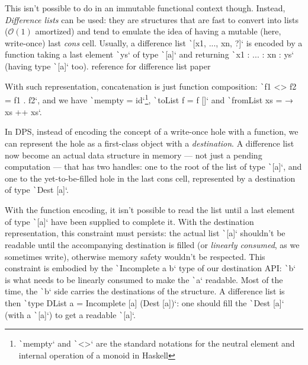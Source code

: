 \documentclass[english]{jflart}
\newcommand{\TODO}[1]{{\color{red}\large #1}}
\begin{document}
This isn't possible to do in an immutable functional context though. Instead, \emph{Difference lists} can be used: they are structures that are fast to convert into lists ($\mathcal{O}(1)$ amortized) and tend to emulate the idea of having a mutable (here, write-once) last \emph{cons} cell. Usually, a difference list \texttt`[x1, ..., xn, ?]` is encoded by a function taking a last element \texttt`ys` of type \texttt`[a]` and returning \texttt`x1 : ... : xn : ys` (having type \texttt`[a]` too). \TODO{reference for difference list paper}

With such representation, concatenation is just function composition: \texttt`f1 <> f2 = f1 . f2`, and we have \texttt`mempty = id`\footnote{\texttt`mempty` and \texttt`<>` are the standard notations for the neutral element and internal operation of a monoid in Haskell}, \texttt`toList f = f []` and \texttt`fromList xs = \ys → xs ++ xs`.

In DPS, instead of encoding the concept of a write-once hole with a function, we can represent the hole as a first-class object with a \emph{destination}. A difference list now become an actual data structure in memory --- not just a pending computation --- that has two handles: one to the root of the list of type \texttt`[a]`, and one to the yet-to-be-filled hole in the last cons cell, represented by a destination of type \texttt`Dest [a]`.

With the function encoding, it isn't possible to read the list until a last element of type \texttt`[a]` have been supplied to complete it. With the destination representation, this constraint must persists: the actual list \texttt`[a]` shouldn't be readable until the accompanying destination is filled (or \emph{linearly consumed}, as we sometimes write), otherwise memory safety wouldn't be respected. This constraint is embodied by the \texttt`Incomplete a b` type of our destination API: \texttt`b` is what needs to be linearly consumed to make the \texttt`a` readable. Most of the time, the \texttt`b` side carries the destinations of the structure. A difference list is then \texttt`type DList a = Incomplete [a] (Dest [a])`: one should fill the \texttt`Dest [a]` (with a \texttt`[a]`) to get a readable \texttt`[a]`.
\end{document}
